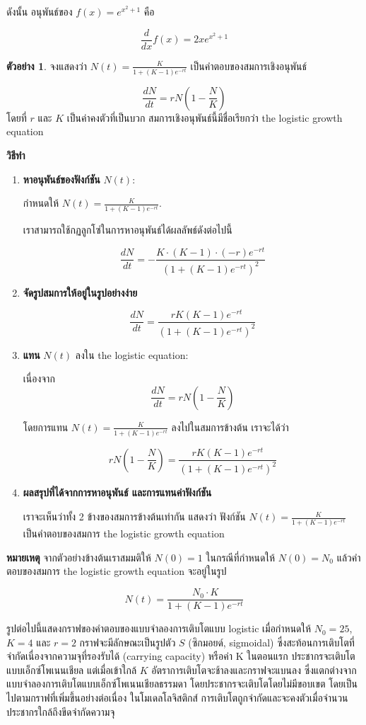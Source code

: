 \documentclass[
]{book}
\theoremstyle{definition}
\theoremstyle{definition}
\newtheorem{example}{ตัวอย่าง}[chapter]
\theoremstyle{definition}
\theoremstyle{definition}
\theoremstyle{remark}
\begin{document}
ดังนั้น อนุพันธ์ของ \(f(x) = e^{x^2 + 1}\) คือ

\[ \boxed{\frac{d}{dx} f(x) = 2x e^{x^2 + 1}} \]

\begin{example}
จงแสดงว่า \(N(t) = \frac{K}{1 + (K - 1) e^{-rt}}\) เป็นคำตอบของสมการเชิงอนุพันธ์

\[ \frac{dN}{dt} = rN\left(1 - \frac{N}{K}\right) \]โดยที่ \(r\) และ \(K\)
เป็นค่าคงตัวที่เป็นบวก สมการเชิงอนุพันธ์นี้มีชื่อเรียกว่า the logistic growth equation
\end{example}

\textbf{วิธีทำ}

\begin{enumerate}
\def\labelenumi{\arabic{enumi}.}
\item
  \textbf{หาอนุพันธ์ของฟังก์ชัน} \(N(t)\):

  กำหนดให้ \(N(t) = \frac{K}{1 + (K - 1) e^{-rt}}\).

  เราสามารถใช้กฏลูกโซ่ในการหาอนุพันธ์ได้ผลลัพธ์ดังต่อไปนี้

  \[ \frac{dN}{dt} = -\frac{K \cdot (K - 1) \cdot (-r) e^{-rt}}{(1 + (K - 1) e^{-rt})^2} \]
\item
  \textbf{จัดรูปสมการให้อยู่ในรูปอย่างง่าย}

  \[ \frac{dN}{dt} = \frac{rK(K - 1) e^{-rt}}{(1 + (K - 1) e^{-rt})^2} \]
\item
  \textbf{แทน} \(N(t)\) ลงใน the logistic equation:

  เนื่องจาก\[ \frac{dN}{dt} = rN\left(1 - \frac{N}{K}\right) \]

  โดยการแทน \(N(t) = \frac{K}{1 + (K - 1) e^{-rt}}\) ลงไปในสมการข้างต้น
  เราจะได้ว่า

  \[ rN\left(1 - \frac{N}{K}\right) = \frac{rK(K - 1) e^{-rt}}{(1 + (K - 1) e^{-rt})^2} \]
\item
  \textbf{ผลสรุปที่ได้จากการหาอนุพันธ์ และการแทนค่าฟังก์ชัน}

  เราจะเห็นว่าทั้ง 2 ข้างของสมการข้างต้นเท่ากัน แสดงว่า ฟังก์ชัน
  \(N(t) = \frac{K}{1 + (K - 1) e^{-rt}}\) เป็นคำตอบของสมการ the logistic
  growth equation
\end{enumerate}

\textbf{หมายเหตุ} จากตัวอย่างข้างต้นเราสมมติให้ \(N(0) = 1\) ในกรณีที่กำหนดให้
\(N(0) = N_0\) แล้วคำตอบของสมการ the logistic growth equation จะอยู่ในรูป

\[N(t) = \frac{N_0 \cdot K}{1 + (K - 1) e^{-rt}}\]

รูปต่อไปนี้แสดงกราฟของคำตอบของแบบจำลองการเติบโตแบบ logistic เมื่อกำหนดให้
\(N_0 = 25\), \(K = 4\) และ \(r = 2\) กราฟจะมีลักษณะเป็นรูปตัว \(S\) (ซิกมอยด์,
sigmoidal) ซึ่งสะท้อนการเติบโตที่จำกัดเนื่องจากความจุที่รองรับได้ (carrying capacity)
หรือค่า K ในตอนแรก ประชากรจะเติบโตแบบเอ็กซ์โพเนนเชียล แต่เมื่อเข้าใกล้ \(K\)
อัตราการเติบโตจะช้าลงและกราฟจะแบนลง
ซึ่งแตกต่างจากแบบจำลองการเติบโตแบบเอ็กซ์โพเนนเชียลธรรมดา
โดยประชากรจะเติบโตโดยไม่มีขอบเขต โดยเป็นไปตามกราฟที่เพิ่มขึ้นอย่างต่อเนื่อง
ในโมเดลโลจิสติกส์ การเติบโตถูกจำกัดและจะคงตัวเมื่อจำนวนประชากรใกล้ถึงขีดจำกัดความจุ
\end{document}
